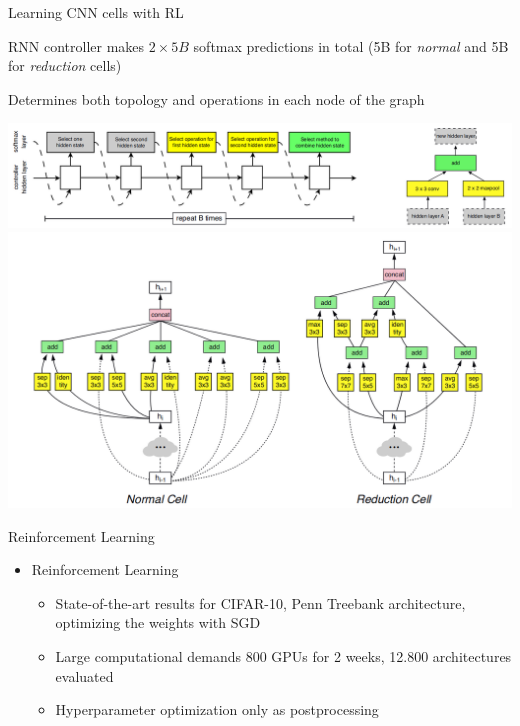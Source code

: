 \begin{frame}[c]{Learning CNN cells with RL }
\centering

\begin{itemize}
	\footnotesize{
	\item RNN controller makes $2\times 5B$ softmax predictions in total 
	(5B for \textit{normal} and 5B for \textit{reduction} cells)
	\item Determines both topology and operations in each node of the graph
	}
\end{itemize}
\includegraphics[width=.8\textwidth]{images_lec7/RL_conv_cell}
\includegraphics[width=.7\textwidth]{images_lec7/RL_normal_reduction}

\end{frame}

\begin{frame}[c]{Reinforcement Learning }
\begin{itemize}
	\item Reinforcement Learning 
	\begin{itemize}
		\item State-of-the-art results for CIFAR-10, Penn Treebank
		architecture, optimizing the weights with SGD
		\item Large computational demands \alert{800 GPUs for 2 weeks, 12.800 architectures evaluated}
		\item Hyperparameter optimization only as postprocessing
	\end{itemize}
\end{itemize}
\end{frame}

